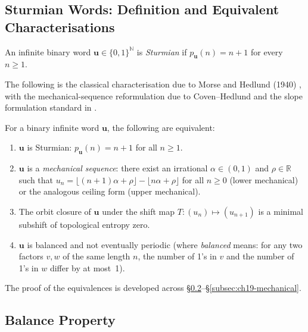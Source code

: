 \subsection{Sturmian Words: Definition and Equivalent Characterisations}
\label{subsec:ch19-sturmian}

\begin{definition}\label{def:sturmian}
  An infinite binary word \(\mathbf{u}\in\{0,1\}^{\mathbb{N}}\) is
  \emph{Sturmian} if \(p_{\mathbf{u}}(n)=n+1\) for every \(n\geq 1\).
\end{definition}

The following is the classical characterisation due to Morse and Hedlund
(1940) \cite{morse1940symbolic}, with the mechanical-sequence reformulation
due to Coven--Hedlund and the slope formulation standard in
\cite{lothaire2002algebraic}.

\begin{theorem}%
  \label{thm:sturmian-equiv}
  For a binary infinite word \(\mathbf{u}\), the following are equivalent:
  \begin{enumerate}[label=(\roman*)]
    \item \(\mathbf{u}\) is Sturmian: \(p_{\mathbf{u}}(n)=n+1\) for all
      \(n\geq 1\).
    \item \(\mathbf{u}\) is a \emph{mechanical sequence}: there exist
      an irrational \(\alpha\in(0,1)\) and \(\rho\in\mathbb{R}\) such
      that \(u_n = \lfloor(n+1)\alpha+\rho\rfloor - \lfloor n\alpha+\rho\rfloor\)
      for all \(n\geq 0\) (lower mechanical) or the analogous ceiling
      form (upper mechanical).
    \item The orbit closure of \(\mathbf{u}\) under the shift map
      \(T\colon(u_n)\mapsto(u_{n+1})\) is a minimal subshift of
      topological entropy zero.
    \item \(\mathbf{u}\) is balanced and not eventually periodic
      (where \emph{balanced} means: for any two factors
      \(v,w\) of the same length \(n\), the number of 1's in \(v\)
      and the number of 1's in \(w\) differ by at most~1).
  \end{enumerate}
\end{theorem}

The proof of the equivalences is developed across
\S\ref{subsec:ch19-balanced}--\S\ref{subsec:ch19-mechanical}.

\subsection{Balance Property}
\label{subsec:ch19-balanced}

